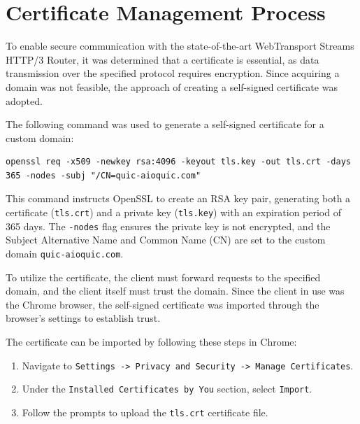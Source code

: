





\section{Certificate Management Process}
To enable secure communication with the state-of-the-art WebTransport Streams HTTP/3 Router, it was determined that a certificate is essential, as data transmission over the specified protocol requires encryption. Since acquiring a domain was not feasible, the approach of creating a self-signed certificate was adopted.

The following command was used to generate a self-signed certificate for a custom domain:

\begin{lstlisting}
openssl req -x509 -newkey rsa:4096 -keyout tls.key -out tls.crt -days 365 -nodes -subj "/CN=quic-aioquic.com"
\end{lstlisting}

This command instructs OpenSSL to create an RSA key pair, generating both a certificate (\texttt{tls.crt}) and a private key (\texttt{tls.key}) with an expiration period of 365 days. The \texttt{-nodes} flag ensures the private key is not encrypted, and the Subject Alternative Name and Common Name (CN) are set to the custom domain \texttt{quic-aioquic.com}.

To utilize the certificate, the client must forward requests to the specified domain, and the client itself must trust the domain. Since the client in use was the Chrome browser, the self-signed certificate was imported through the browser's settings to establish trust.

The certificate can be imported by following these steps in Chrome:

\begin{enumerate}
    \item Navigate to \texttt{Settings -> Privacy and Security -> Manage Certificates}.
    \item Under the \texttt{Installed Certificates by You} section, select \texttt{Import}.
    \item Follow the prompts to upload the \texttt{tls.crt} certificate file.
\end{enumerate}

